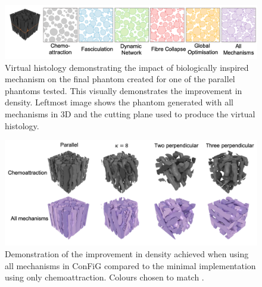 \begin{figure}
  \centering
  \includegraphics[width=\textwidth]{figures/config/improvements_virthist.png}
  \caption[Impact of biological mechanisms on virtual histology]{Virtual histology demonstrating the impact of biologically inspired mechanism on the final phantom created for one of the parallel phantoms tested. This visually demonstrates the improvement in density. Leftmost image shows the phantom generated with all mechanisms in 3D and the cutting plane used to produce the virtual histology.  }
  \label{fig:config_res_improvements_virthist}
\end{figure}

\begin{figure}
  \centering
  \includegraphics[width=\textwidth]{figures/config/improvement_3drender.png}
  \caption[Impact of biological mechanisms on 3D phantoms]{Demonstration of the improvement in density achieved when using all mechanisms in ConFiG compared to the minimal implementation using only chemoattraction. Colours chosen to match . }
  \label{fig:config_res_improvements_3d}
\end{figure}


